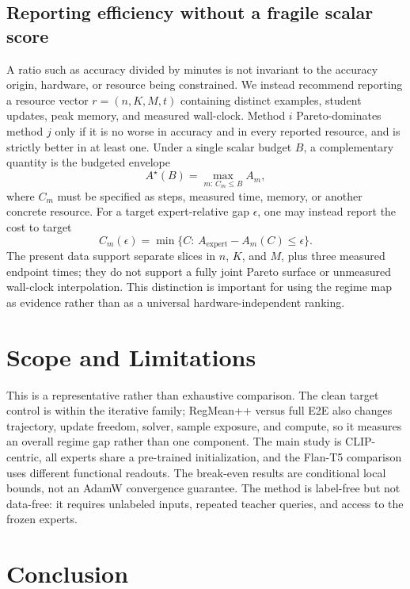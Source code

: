 \documentclass[letterpaper]{article} %
\theoremstyle{plain}
\theoremstyle{definition}
\begin{document}
\subsection{Reporting efficiency without a fragile scalar score}
\label{sec:efficiency-metrics}
A ratio such as accuracy divided by minutes is not invariant to the accuracy origin, hardware,
or resource being constrained. We instead recommend reporting a resource vector
$r=(n,K,M,t)$ containing distinct examples, student updates, peak memory, and measured
wall-clock. Method $i$ Pareto-dominates method $j$ only if it is no worse in accuracy and in
every reported resource, and is strictly better in at least one. Under a single scalar budget
$B$, a complementary quantity is the budgeted envelope
\begin{equation}
A^\star(B)=\max_{m:\,C_m\le B} A_m,
\label{eq:budget-envelope-main}
\end{equation}
where $C_m$ must be specified as steps, measured time, memory, or another concrete resource.
For a target expert-relative gap $\epsilon$, one may instead report the cost to target
\begin{equation}
C_m(\epsilon)=\min\{C:\,A_{\mathrm{expert}}-A_m(C)\le\epsilon\}.
\label{eq:cost-target-main}
\end{equation}
The present data support separate slices in $n$, $K$, and $M$, plus three measured endpoint
times; they do not support a fully joint Pareto surface or unmeasured wall-clock interpolation.
This distinction is important for using the regime map as evidence rather than as a universal
hardware-independent ranking.

\section{Scope and Limitations}
\label{sec:limitations-main}
This is a representative rather than exhaustive comparison. The clean target control is within
the iterative family; RegMean++ versus full E2E also changes trajectory, update freedom, solver,
sample exposure, and compute, so it measures an overall regime gap rather than one component.
The main study is CLIP-centric, all experts share a pre-trained initialization, and the Flan-T5
comparison uses different functional readouts. The break-even results are conditional local
bounds, not an AdamW convergence guarantee. The method is label-free but not data-free: it
requires unlabeled inputs, repeated teacher queries, and access to the frozen experts.

\section{Conclusion}
\label{sec:conclusion}
\end{document}
